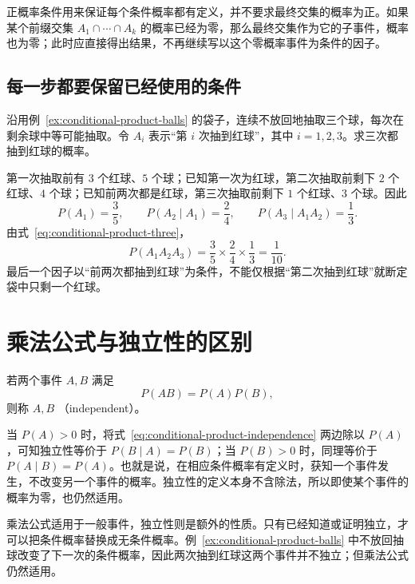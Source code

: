 \documentclass[UTF8]{ctexart}
\begin{document}
正概率条件用来保证每个条件概率都有定义，并不要求最终交集的概率为正。如果某个前缀交集 $A_1\cap\cdots\cap A_k$ 的概率已经为零，那么最终交集作为它的子事件，概率也为零；此时应直接得出结果，不再继续写以这个零概率事件为条件的因子。

\subsection{每一步都要保留已经使用的条件}

\begin{example}[连续三次抽到红球]
沿用例~\ref{ex:conditional-product-balls} 的袋子，连续不放回地抽取三个球，每次在剩余球中等可能抽取。令 $A_i$ 表示“第 $i$ 次抽到红球”，其中 $i=1,2,3$。求三次都抽到红球的概率。
\end{example}
\begin{solve}
第一次抽取前有 $3$ 个红球、$5$ 个球；已知第一次为红球，第二次抽取前剩下 $2$ 个红球、$4$ 个球；已知前两次都是红球，第三次抽取前剩下 $1$ 个红球、$3$ 个球。因此
\[
  P(A_1)=\frac35,\qquad
  P(A_2\mid A_1)=\frac24,\qquad
  P(A_3\mid A_1A_2)=\frac13.
\]
由式~\eqref{eq:conditional-product-three}，
\[
  P(A_1A_2A_3)=\frac35\times\frac24\times\frac13=\frac1{10}.
\]
最后一个因子以“前两次都抽到红球”为条件，不能仅根据“第二次抽到红球”就断定袋中只剩一个红球。
\end{solve}

\section{乘法公式与独立性的区别}
\label{sec:conditional-product-independence}

\begin{definition}[两个事件的独立性]
\label{def:conditional-product-independence}
若两个事件 $A,B$ 满足
\begin{equation}
  P(AB)=P(A)P(B),
  \label{eq:conditional-product-independence}
\end{equation}
则称 $A,B$ （independent）。
\end{definition}

当 $P(A)>0$ 时，将式~\eqref{eq:conditional-product-independence} 两边除以 $P(A)$，可知独立性等价于 $P(B\mid A)=P(B)$；当 $P(B)>0$ 时，同理等价于 $P(A\mid B)=P(A)$。也就是说，在相应条件概率有定义时，获知一个事件发生，不改变另一个事件的概率。独立性的定义本身不含除法，所以即使某个事件的概率为零，也仍然适用。

乘法公式适用于一般事件，独立性则是额外的性质。只有已经知道或证明独立，才可以把条件概率替换成无条件概率。例~\ref{ex:conditional-product-balls} 中不放回抽球改变了下一次的条件概率，因此两次抽到红球这两个事件并不独立；但乘法公式仍然适用。
\end{document}
